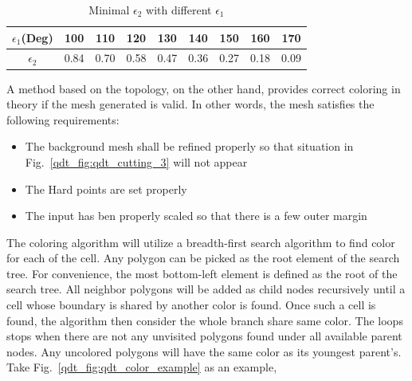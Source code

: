     \begin{table}[h!]
        \centering
        \caption{Minimal $\epsilon_2$ with different $\epsilon_1$}
        \label{qdt_tab:qdt_coloring_ep1_ep2}
        \begin{tabular}{ccccccccc}
            \toprule
            $\epsilon_1$(Deg) & 100    & 110      & 120     & 130      & 140     & 150   &   160  &  170   \\
            \midrule    
            $\epsilon_2$ & 0.84 & 0.70 & 0.58 & 0.47 & 0.36 & 0.27 &    0.18 &  0.09\\
            \bottomrule
        \end{tabular}
    \end{table}
A method based on the topology, on the other hand, provides correct coloring in theory if the mesh generated is valid.
In other words, the mesh satisfies the following requirements:
    \begin{itemize}
        \item The background mesh shall be refined properly so that situation in Fig.~\ref{qdt_fig:qdt_cutting_3} will not appear
        \item The Hard points are set properly
        \item The input has ben properly scaled so that there is a few outer margin
    \end{itemize}
The coloring algorithm will utilize a breadth-first search algorithm to find color for each of the cell.
Any polygon can be picked as the root element of the search tree.
For convenience, the most bottom-left element is defined as the root of the search tree.
All neighbor polygons will be added as child nodes recursively until a cell whose boundary is shared by another color is found.
Once such a cell is found, the algorithm then consider the whole branch share same color.
The loops stops when there are not any unvisited polygons found under all available parent nodes. 
Any uncolored polygons will have the same color as its youngest parent's.
Take Fig.~\ref{qdt_fig:qdt_color_example} as an example,

